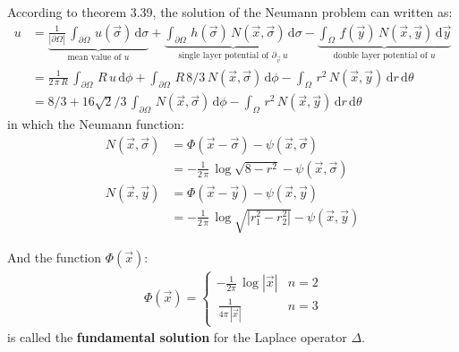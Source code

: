 \documentclass[../main.tex]{subfiles}
\begin{document}
According to theorem 3.39, the solution of the Neumann problem can written as:
\begin{align}
    u &= \underbrace{\frac{1}{|\partial \Omega|} \, \int_{\partial \Omega} \, u(\vec{\sigma}) \, \mathrm{d} \sigma}_{\text{mean value of }u} + \underbrace{\int_{\partial \Omega} \, h(\vec{\sigma}) \, N(\vec{x}, \vec{\sigma}) \, \mathrm{d} \sigma}_{\text{single layer potential of $\partial_{\vec{v}} \, u$}} - \underbrace{\int_{\Omega} \, f(\vec{y}) \, N(\vec{x}, \vec{y}) \, \mathrm{d} \vec{y}}_{\text{double layer potential of $u$}} \\
    &= \frac{1}{2 \, \pi \, R} \, \int_{\partial \Omega} \, R \, u \, \mathrm{d} \phi + \int_{\partial \Omega} \, R \, 8/3 \, N(\vec{x}, \vec{\sigma}) \, \mathrm{d} \phi - \int_{\Omega} \, r^2 \, N(\vec{x}, \vec{y}) \, \mathrm{d} r \, \mathrm{d} \theta \\
    &= 8/3 + 16\sqrt{2}/3 \, \int_{\partial \Omega} \, N(\vec{x}, \vec{\sigma}) \, \mathrm{d} \phi - \int_{\Omega} \, r^2 \, N(\vec{x}, \vec{y}) \, \mathrm{d} r \, \mathrm{d} \theta
\end{align}
in which the Neumann function:
\begin{align}
    N(\vec{x}, \vec{\sigma}) &= \Phi(\vec{x} - \vec{\sigma}) - \psi(\vec{x}, \vec{\sigma}) \\
    &= - \frac{1}{2 \, \pi} \, \log{\sqrt{8 - r^2}} - \psi(\vec{x}, \vec{\sigma}) \\
    N(\vec{x}, \vec{y}) &= \Phi(\vec{x} - \vec{y}) - \psi(\vec{x}, \vec{y}) \\
    &= - \frac{1}{2 \, \pi} \, \log{\sqrt{|r_1^2 - r_2^2|}} - \psi(\vec{x}, \vec{y})
\end{align}

And the function $\Phi(\vec{x})$:
\begin{align} \label{eq:LE58}
    \, \Phi(\vec{x}) = \begin{cases} - \frac{1}{2 \pi} \, \log{|\vec{x}|} & n = 2 \\
    \, \frac{1}{4 \pi \, |\vec{x}|} & n = 3
    \end{cases}
\end{align}
is called the \textbf{fundamental solution} for the Laplace operator $\Delta$.
\end{document}
